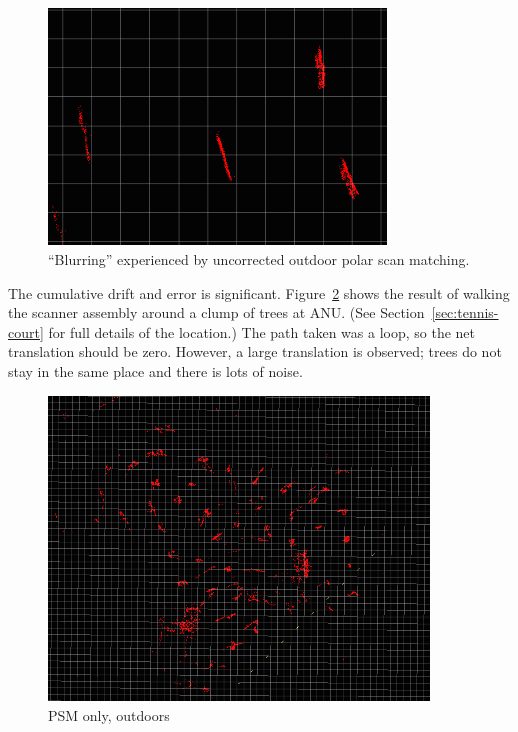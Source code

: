 \documentclass[12pt,oneside,a4paper]{book}
\begin{document}
\begin{figure}[h!]
  \centering
  \includegraphics[width=0.8\textwidth]{figs/blurring}
  \caption{``Blurring'' experienced by uncorrected outdoor polar scan matching.}
  \label{fig:blur-detailed}
\end{figure}

The cumulative drift and error is
significant. Figure~\ref{fig:psm-outdoor} shows the result of walking
the scanner assembly around a clump of trees at ANU. (See
Section~\ref{sec:tennis-court} for full details of the location.) The
path taken was a loop, so the net translation should be zero. However, a
large translation is observed; trees do not stay in the same place and
there is lots of noise.

\begin{figure}
  \centering
  \includegraphics[width=0.9\textwidth]{figs/psm-outdoor}
  \caption{PSM only, outdoors}
  \label{fig:psm-outdoor}
\end{figure}
\end{document}
